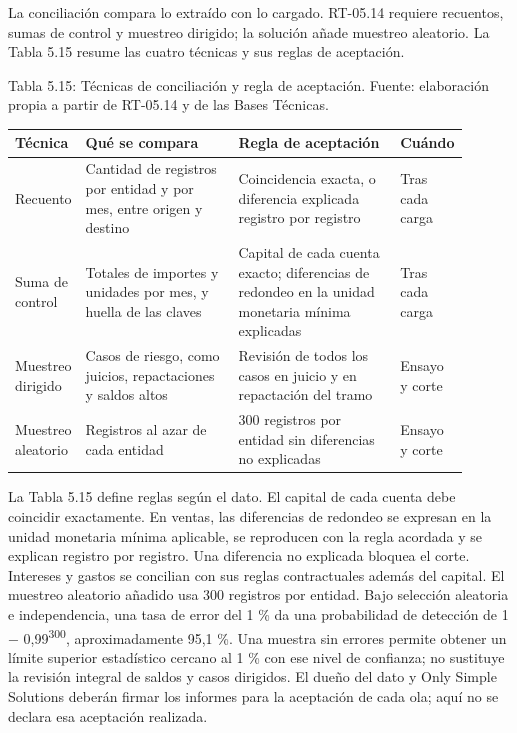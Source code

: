 \documentclass[11pt]{article}
\begin{document}
La conciliación compara lo extraído con lo cargado. RT-05.14 requiere recuentos, sumas de control y muestreo dirigido; la solución añade muestreo aleatorio. La Tabla 5.15 resume las cuatro técnicas y sus reglas de aceptación.

\par\vspace{0.6\baselineskip}\noindent\begin{minipage}{\linewidth}
Tabla 5.15: Técnicas de conciliación y regla de aceptación. Fuente: elaboración propia a partir de RT-05.14 y de las Bases Técnicas.\label{tab:t20}\par\vspace{0.3\baselineskip}
\begin{tabular}{@{}p{0.098\linewidth}p{0.345\linewidth}p{0.368\linewidth}p{0.090\linewidth}@{}}
\toprule Técnica & Qué se compara & Regla de aceptación & Cuándo \\
\midrule
Recuento & Cantidad de registros por entidad y por mes, entre origen y destino & Coincidencia exacta, o diferencia explicada registro por registro & Tras cada carga \\
Suma de control & Totales de importes y unidades por mes, y huella de las claves & Capital de cada cuenta exacto; diferencias de redondeo en la unidad monetaria mínima explicadas & Tras cada carga \\
Muestreo dirigido & Casos de riesgo, como juicios, repactaciones y saldos altos & Revisión de todos los casos en juicio y en repactación del tramo & Ensayo y corte \\
Muestreo aleatorio & Registros al azar de cada entidad & 300 registros por entidad sin diferencias no explicadas & Ensayo y corte \\
\bottomrule
\end{tabular}
\end{minipage}
\par


La Tabla 5.15 define reglas según el dato. El capital de cada cuenta debe coincidir exactamente. En ventas, las diferencias de redondeo se expresan en la unidad monetaria mínima aplicable, se reproducen con la regla acordada y se explican registro por registro. Una diferencia no explicada bloquea el corte. Intereses y gastos se concilian con sus reglas contractuales además del capital. El muestreo aleatorio añadido usa 300 registros por entidad. Bajo selección aleatoria e independencia, una tasa de error del 1 \% da una probabilidad de detección de 1 − 0,99\textsuperscript{300}, aproximadamente 95,1 \%. Una muestra sin errores permite obtener un límite superior estadístico cercano al 1 \% con ese nivel de confianza; no sustituye la revisión integral de saldos y casos dirigidos. El dueño del dato y Only Simple Solutions deberán firmar los informes para la aceptación de cada ola; aquí no se declara esa aceptación realizada.
\end{document}
